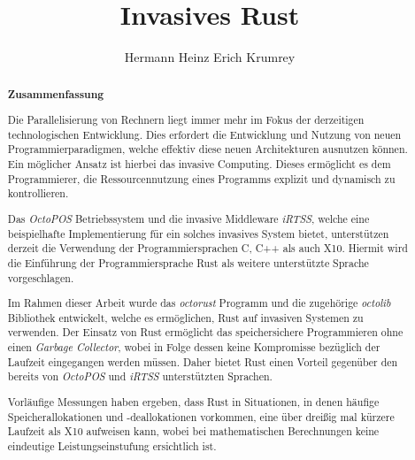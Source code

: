 \documentclass[parskip=full,12pt,a4paper,twoside,headings=openright]{scrreprt}
\title{Invasives Rust}
\author{Hermann Heinz Erich Krumrey}
\begin{document}
\begin{otherlanguage}{ngerman} %
\mytitlepage
\end{otherlanguage}

\begin{abstract}
\begin{center}\Huge\textbf{\textsf{Zusammenfassung}}
\end{center}
\vfill

Die Parallelisierung von Rechnern liegt immer mehr im Fokus der derzeitigen technologischen Entwicklung.
Dies erfordert die Entwicklung und Nutzung von neuen Programmierparadigmen, welche effektiv
diese neuen Architekturen ausnutzen können. Ein möglicher Ansatz ist hierbei das
invasive Computing. Dieses ermöglicht es dem Programmierer, die Ressourcennutzung
eines Programms explizit und dynamisch zu kontrollieren.

Das \textit{OctoPOS} Betriebssystem und die invasive Middleware \textit{iRTSS},
welche eine beispielhafte Implementierung für ein solches
invasives System bietet, unterstützen derzeit die Verwendung der Programmiersprachen
C, C++ als auch X10. Hiermit wird die Einführung der Programmiersprache Rust als
weitere unterstützte Sprache vorgeschlagen.

Im Rahmen dieser Arbeit wurde das \textit{octorust} Programm und die zugehörige \textit{octolib} Bibliothek
entwickelt, welche es ermöglichen, Rust auf invasiven Systemen zu verwenden. Der Einsatz von Rust
ermöglicht das speichersichere Programmieren ohne einen \textit{Garbage Collector}, wobei in Folge dessen
keine Kompromisse bezüglich der Laufzeit eingegangen werden müssen. Daher bietet Rust einen
Vorteil gegenüber den bereits von \textit{OctoPOS} und \textit{iRTSS} unterstützten Sprachen.

Vorläufige Messungen haben ergeben, dass Rust in Situationen, in denen häufige Speicherallokationen und
-deallokationen vorkommen, eine über dreißig mal kürzere Laufzeit als X10 aufweisen kann, wobei bei mathematischen
Berechnungen keine eindeutige Leistungseinstufung ersichtlich ist.

\vfill

\tiny
{}

\end{abstract}
\end{document}
